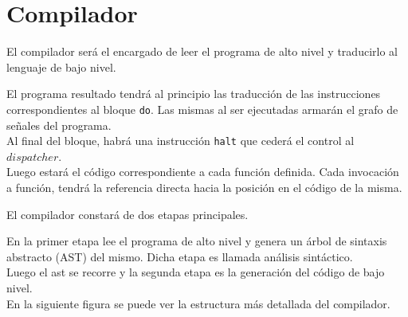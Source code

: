 \pagebreak
\section{Compilador}

  El compilador será el encargado de leer el programa de alto nivel y
traducirlo al lenguaje de bajo nivel.

  El programa resultado tendrá al principio las traducción de las instrucciones
correspondientes al bloque \texttt{do}. Las mismas al ser ejecutadas armarán el
grafo de señales del programa.\\
  Al final del bloque, habrá una instrucción \texttt{halt} que cederá el control
al $dispatcher$.\\
  Luego estará el código correspondiente a cada función definida. Cada invocación
a función, tendrá la referencia directa hacia la posición en el código de la misma.

  El compilador constará de dos etapas principales.

  En la primer etapa lee el programa de alto nivel y
  genera un árbol de sintaxis
  abstracto (AST) del mismo. Dicha etapa es llamada análisis sintáctico.\\

  Luego el ast se recorre y la segunda etapa es la generación del
  código de bajo nivel.\\

  En la siguiente figura se puede ver la estructura más detallada
  del compilador.

